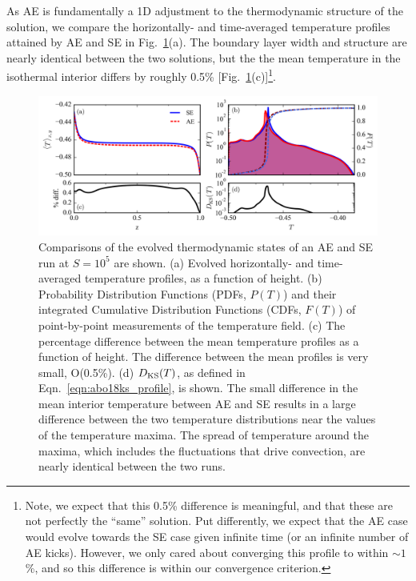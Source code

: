 As AE is fundamentally a 1D adjustment to the thermodynamic structure of the solution, we compare the horizontally- and time-averaged temperature profiles attained by AE and SE in Fig.~\ref{fig:temp_comparison}(a).  
The boundary layer width and structure are nearly identical between the two solutions, but the the mean temperature in the isothermal interior differs by roughly 0.5\% [Fig.~\ref{fig:temp_comparison}(c)]\footnote{
Note, we expect that this 0.5\% difference is meaningful, and that these are not perfectly the ``same'' solution.
Put differently, we expect that the AE case would evolve towards the SE case given infinite time (or an infinite number of AE kicks).
However, we only cared about converging this profile to within $\sim 1$\%, and so this difference is within our convergence criterion.
}. 

\begin{figure}[ht!]
\includegraphics[width=\textwidth]{./figs/temp_comparison.pdf}
\caption[Evolved thermodynamic states of AE and SE simulations.]
{
	Comparisons of the evolved thermodynamic states of an AE and SE run at $S = 10^{5}$ are shown.  
	(a) Evolved horizontally- and time-averaged temperature profiles, as a function of height.
	(b) Probability Distribution Functions (PDFs, $P(T)$) and their integrated Cumulative Distribution Functions (CDFs, $F(T)$) of point-by-point measurements of the temperature field.
	(c) The percentage difference between the mean temperature profiles as a function of height.
	The difference between the mean profiles is very small, O(0.5\%).
	(d) $D_{\text{KS}}(T)$, as defined in Eqn.~\ref{eqn:abo18ks_profile}, is shown. 
	The small difference in the mean interior temperature between AE and SE results in a large difference between the two temperature distributions near the values of the temperature maxima.  
	The spread of temperature around the maxima, which includes the fluctuations that drive convection, are nearly identical between the two runs. 
	\label{fig:temp_comparison} 
}
\end{figure}

